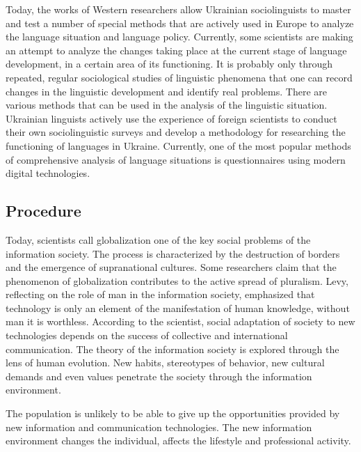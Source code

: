 \documentclass[english]{textolivre}
\begin{document}
Today, the works of Western researchers allow Ukrainian sociolinguists to master and test a number of special methods that are actively used in Europe to analyze the language situation and language policy. Currently, some scientists are making an attempt to analyze the changes taking place at the current stage of language development, in a certain area of its functioning. It is probably only through repeated, regular sociological studies of linguistic phenomena that one can record changes in the linguistic development and identify real problems. There are various methods that can be used in the analysis of the linguistic situation. Ukrainian linguists actively use the experience of foreign scientists to conduct their own sociolinguistic surveys and develop a methodology for researching the functioning of languages in Ukraine. Currently, one of the most popular methods of comprehensive analysis of language situations is questionnaires using modern digital technologies.


\subsection{Procedure}
Today, scientists call globalization one of the key social problems of the information society. The process is characterized by the destruction of borders and the emergence of supranational cultures. Some researchers claim that the phenomenon of globalization contributes to the active spread of pluralism. Levy, reflecting on the role of man in the information society, emphasized that technology is only an element of the manifestation of human knowledge, without man it is worthless. According to the scientist, social adaptation of society to new technologies depends on the success of collective and international communication. The theory of the information society is explored through the lens of human evolution. New habits, stereotypes of behavior, new cultural demands and even values penetrate the society through the information environment. 

The population is unlikely to be able to give up the opportunities provided by new information and communication technologies. The new information environment changes the individual, affects the lifestyle and professional activity.
\end{document}
